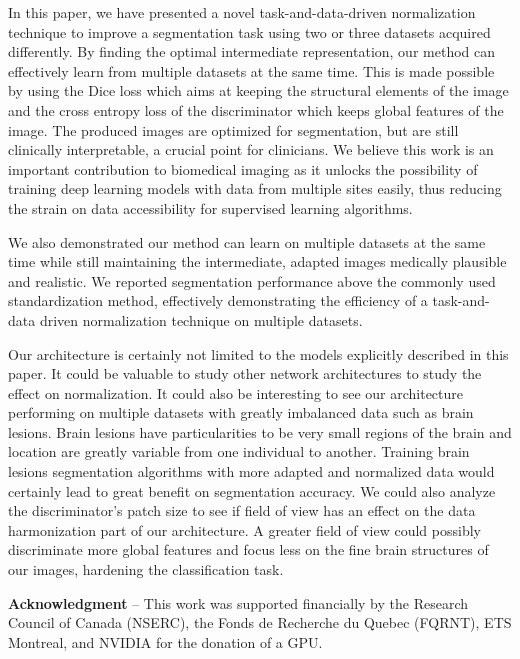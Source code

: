 \documentclass[preprint,12pt]{elsarticle}
\begin{document}

In this paper, we have presented a novel task-and-data-driven normalization technique to improve a segmentation task using two or three datasets acquired differently. By finding the optimal intermediate representation,  our method can effectively learn from multiple datasets at the same time. This is made possible by using the Dice loss which aims at keeping the structural elements of the image and the cross entropy loss of the discriminator which keeps global features of the image. The produced images are optimized for segmentation, but are still clinically interpretable, a crucial point for clinicians. We believe this work is an important contribution to biomedical imaging as it unlocks the possibility of training deep learning models with data from multiple sites easily, thus reducing the strain on data accessibility for supervised learning algorithms.

We also demonstrated our method can learn on multiple datasets at the same time while still maintaining the intermediate, adapted images medically plausible and realistic. We reported segmentation performance above the commonly used standardization method, effectively demonstrating the efficiency of a task-and-data driven normalization technique on multiple datasets.

Our architecture is certainly not limited to the models explicitly described in this paper. It could be valuable to study other network architectures to study the effect on normalization. It could also be interesting to see our architecture performing on multiple datasets with greatly imbalanced data such as brain lesions. Brain lesions have particularities to be very small regions of the brain and location are greatly variable from one individual to another. Training brain lesions segmentation algorithms with more adapted and normalized data would certainly lead to great benefit on segmentation accuracy. We could also analyze the discriminator's patch size to see if field of view has an effect on the data harmonization part of our architecture. A greater field of view could possibly discriminate more global features and focus less on the fine brain structures of our images, hardening the classification task.

\medskip

\textbf{Acknowledgment} -- This work was supported financially by the Research Council of Canada (NSERC), the  Fonds  de Recherche du Quebec (FQRNT), ETS Montreal, and NVIDIA for the donation of a GPU.
\end{document}
